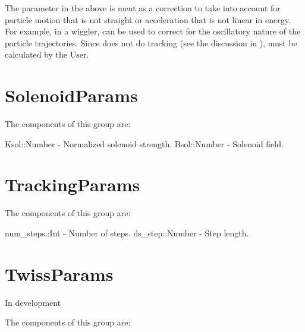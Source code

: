 The  parameter in the above is ment as a correction to take into account 
for particle motion that is not straight or acceleration that is not linear in energy. For example,
in a wiggler,  can be used to correct for the oscillatory nature of the
particle trajectories. 
Since \accellat does not do tracking (see the discussion in ), 
must be calculated by the User.


\section{SolenoidParams}
\label{s:solenoid.g}

The components of this group are:
\begin{example}
  Ksol::Number        - Normalized solenoid strength.       
  Bsol::Number        - Solenoid field. 
\end{example}

\section{TrackingParams}
\label{s:tracking.g}

The components of this group are:
\begin{example}
  num_steps::Int    - Number of steps. 
  ds_step::Number   - Step length. 
\end{example}

\section{TwissParams}
\label{s:twiss.g}

In development

The components of this group are:
\begin{example}
\end{example}
